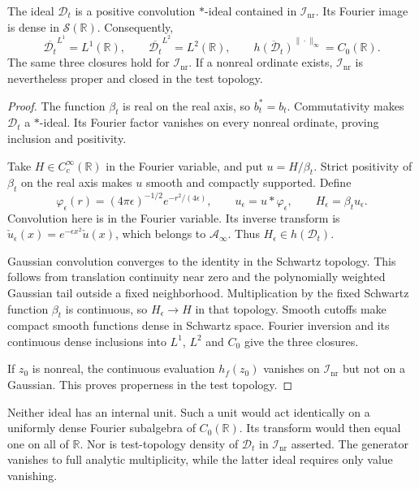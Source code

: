\begin{theorem}
\label{v4-arith:weil:thm:regular-density}
The ideal \(\mathcal D_t\) is a positive convolution \(*\)-ideal
contained in \(\mathcal I_{\mathrm{nr}}\). Its Fourier image is dense
in \(\mathcal S(\mathbb R)\). Consequently,
\[
 \overline{\mathcal D_t}^{L^1}=L^1(\mathbb R),\qquad
 \overline{\mathcal D_t}^{L^2}=L^2(\mathbb R),\qquad
 \overline{h(\mathcal D_t)}^{\|\cdot\|_\infty}=C_0(\mathbb R).
\]
The same three closures hold for \(\mathcal I_{\mathrm{nr}}\).
If a nonreal ordinate exists, \(\mathcal I_{\mathrm{nr}}\) is nevertheless
proper and closed in the test topology.
\end{theorem}
\begin{proof}
The function \(\beta_t\) is real on the real axis, so \(b_t^*=b_t\).
Commutativity makes \(\mathcal D_t\) a \(*\)-ideal. Its Fourier factor
vanishes on every nonreal ordinate, proving inclusion and positivity.

Take \(H\in C_c^\infty(\mathbb R)\) in the Fourier variable, and put
\(u=H/\beta_t\). Strict positivity of \(\beta_t\) on the real axis
makes \(u\) smooth and compactly supported. Define
\[
 \varphi_\epsilon(r)=(4\pi\epsilon)^{-1/2}e^{-r^2/(4\epsilon)},
 \qquad u_\epsilon=u*\varphi_\epsilon,
 \qquad H_\epsilon=\beta_tu_\epsilon.
\]
Convolution here is in the Fourier variable. Its inverse transform is
\(\check u_\epsilon(x)=e^{-\epsilon x^2}\check u(x)\), which belongs
to \(\mathscr A_\infty\). Thus \(H_\epsilon\in h(\mathcal D_t)\).

Gaussian convolution converges to the identity in the Schwartz topology.
This follows from translation continuity near zero and the polynomially
weighted Gaussian tail outside a fixed neighborhood. Multiplication by
the fixed Schwartz function \(\beta_t\) is continuous, so
\(H_\epsilon\to H\) in that topology.
Smooth cutoffs make compact smooth functions dense in Schwartz space.
Fourier inversion and its continuous dense inclusions into \(L^1\),
\(L^2\) and \(C_0\) give the three closures.

If \(z_0\) is nonreal, the continuous evaluation \(h_f(z_0)\) vanishes
on \(\mathcal I_{\mathrm{nr}}\) but not on a Gaussian. This proves
properness in the test topology.
\end{proof}

Neither ideal has an internal unit. Such a unit would act identically
on a uniformly dense Fourier subalgebra of \(C_0(\mathbb R)\).
Its transform would then equal one on all of \(\mathbb R\).
Nor is test-topology density of \(\mathcal D_t\) in
\(\mathcal I_{\mathrm{nr}}\) asserted. The generator vanishes to full
analytic multiplicity, while the latter ideal requires only value
vanishing.


